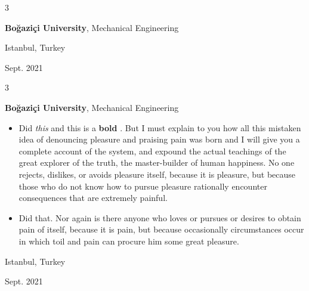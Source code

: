 \documentclass[10pt, letterpaper]{article}
\newenvironment{highlights}{
    \begin{itemize}[
        topsep=0.10 cm,
        parsep=0.10 cm,
        partopsep=0pt,
        itemsep=0pt,
        leftmargin=0.4 cm + 10pt
    ]
}{
    \end{itemize}
} %
\newenvironment{threecolentry}[3][]{
    \onecolentry
    \def\thirdColumn{#3}
    \setcolumnwidth{1 cm, \fill, 4.5 cm}
    \begin{paracol}{3}
    {\raggedright #2} \switchcolumn
}{
    \switchcolumn \raggedleft \thirdColumn
    \end{paracol}
    \endonecolentry
} %
\let\hrefWithoutArrow\href
\renewcommand{\href}[2]{\hrefWithoutArrow{#1}{\mbox{\ifthenelse{\equal{#2}{}}{ }{#2 }\raisebox{.15ex}{\footnotesize \faExternalLink*}}}}
\begin{document}
        \vspace{0.2 cm}

        \begin{threecolentry}{\textbf{}}{
            Istanbul, Turkey

        Sept. 2021
        }
            \textbf{Boğaziçi University}, Mechanical Engineering
        \end{threecolentry}

        \vspace{0.2 cm}

        \begin{threecolentry}{\textbf{}}{
            Istanbul, Turkey

        Sept. 2021
        }
            \textbf{Boğaziçi University}, Mechanical Engineering
            \begin{highlights}
                \item Did \textit{this} and this is a \textbf{bold} \href{https://example.com}{link}. But I must explain to you how all this mistaken idea of denouncing pleasure and praising pain was born and I will give you a complete account of the system, and expound the actual teachings of the great explorer of the truth, the master-builder of human happiness. No one rejects, dislikes, or avoids pleasure itself, because it is pleasure, but because those who do not know how to pursue pleasure rationally encounter consequences that are extremely painful.
                \item Did that. Nor again is there anyone who loves or pursues or desires to obtain pain of itself, because it is pain, but because occasionally circumstances occur in which toil and pain can procure him some great pleasure.
            \end{highlights}
        \end{threecolentry}

        \vspace{0.2 cm}
\end{document}
